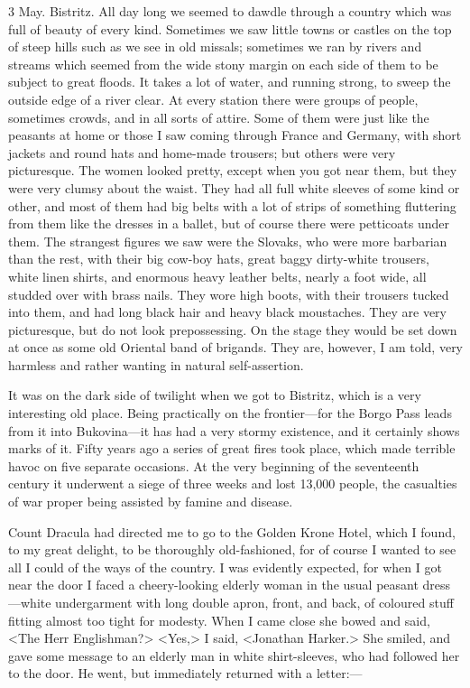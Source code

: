 \begin{diary}{3 May. Bistritz.}
All day long we seemed to dawdle through a country which was full of beauty of every kind. Sometimes we saw little towns or castles on the top of steep hills such as we see in old missals; sometimes we ran by rivers and streams which seemed from the wide stony margin on each side of them to be subject to great floods. It takes a lot of water, and running strong, to sweep the outside edge of a river clear. At every station there were groups of people, sometimes crowds, and in all sorts of attire. Some of them were just like the peasants at home or those I saw coming through France and Germany, with short jackets and round hats and home-made trousers; but others were very picturesque. The women looked pretty, except when you got near them, but they were very clumsy about the waist. They had all full white sleeves of some kind or other, and most of them had big belts with a lot of strips of something fluttering from them like the dresses in a ballet, but of course there were petticoats under them. The strangest figures we saw were the Slovaks, who were more barbarian than the rest, with their big cow-boy hats, great baggy dirty-white trousers, white linen shirts, and enormous heavy leather belts, nearly a foot wide, all studded over with brass nails. They wore high boots, with their trousers tucked into them, and had long black hair and heavy black moustaches. They are very picturesque, but do not look prepossessing. On the stage they would be set down at once as some old Oriental band of brigands. They are, however, I am told, very harmless and rather wanting in natural self-assertion.

It was on the dark side of twilight when we got to Bistritz, which is a very interesting old place. Being practically on the frontier—for the Borgo Pass leads from it into Bukovina—it has had a very stormy existence, and it certainly shows marks of it. Fifty years ago a series of great fires took place, which made terrible havoc on five separate occasions. At the very beginning of the seventeenth century it underwent a siege of three weeks and lost 13,000 people, the casualties of war proper being assisted by famine and disease.

Count Dracula had directed me to go to the Golden Krone Hotel, which I found, to my great delight, to be thoroughly old-fashioned, for of course I wanted to see all I could of the ways of the country. I was evidently expected, for when I got near the door I faced a cheery-looking elderly woman in the usual peasant dress—white undergarment with long double apron, front, and back, of coloured stuff fitting almost too tight for modesty. When I came close she bowed and said, <The Herr Englishman?> <Yes,> I said, <Jonathan Harker.> She smiled, and gave some message to an elderly man in white shirt-sleeves, who had followed her to the door. He went, but immediately returned with a letter:—


\end{diary}
